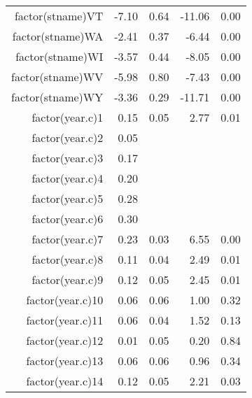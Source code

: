 \begin{table}[ht]
\begin{tabular}{rrrrr}
  factor(stname)VT & -7.10 & 0.64 & -11.06 & 0.00 \\ 
  factor(stname)WA & -2.41 & 0.37 & -6.44 & 0.00 \\ 
  factor(stname)WI & -3.57 & 0.44 & -8.05 & 0.00 \\ 
  factor(stname)WV & -5.98 & 0.80 & -7.43 & 0.00 \\ 
  factor(stname)WY & -3.36 & 0.29 & -11.71 & 0.00 \\ 
  factor(year.c)1 & 0.15 & 0.05 & 2.77 & 0.01 \\ 
  factor(year.c)2 & 0.05 &  &  &  \\ 
  factor(year.c)3 & 0.17 &  &  &  \\ 
  factor(year.c)4 & 0.20 &  &  &  \\ 
  factor(year.c)5 & 0.28 &  &  &  \\ 
  factor(year.c)6 & 0.30 &  &  &  \\ 
  factor(year.c)7 & 0.23 & 0.03 & 6.55 & 0.00 \\ 
  factor(year.c)8 & 0.11 & 0.04 & 2.49 & 0.01 \\ 
  factor(year.c)9 & 0.12 & 0.05 & 2.45 & 0.01 \\ 
  factor(year.c)10 & 0.06 & 0.06 & 1.00 & 0.32 \\ 
  factor(year.c)11 & 0.06 & 0.04 & 1.52 & 0.13 \\ 
  factor(year.c)12 & 0.01 & 0.05 & 0.20 & 0.84 \\ 
  factor(year.c)13 & 0.06 & 0.06 & 0.96 & 0.34 \\ 
  factor(year.c)14 & 0.12 & 0.05 & 2.21 & 0.03 \\ 
   \hline
\end{tabular}
\end{table}
